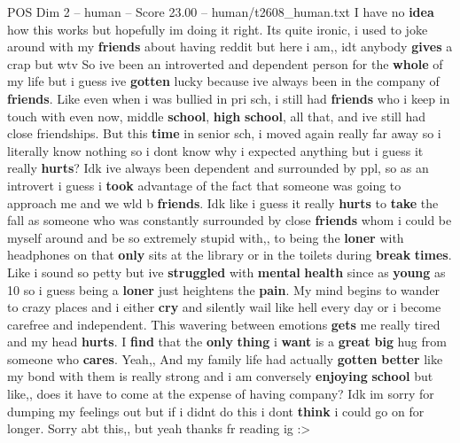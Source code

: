 \begin{textsample}{POS Dim 2 – human – Score 23.00 – human/t2608\_human.txt}  \label{ex:f2_pos_025}
I have no \textbf{idea} how this works but hopefully im doing it right.
Its quite ironic, i used to joke around with my \textbf{friends} about having reddit but here i am,, idt anybody \textbf{gives} a crap but wtv So ive been an introverted and dependent person for the \textbf{whole} of my life but i guess ive \textbf{gotten} lucky because ive always been in the company of \textbf{friends}.
Like even when i was bullied in pri sch, i still had \textbf{friends} who i keep in touch with even now, middle \textbf{school}, \textbf{high} \textbf{school}, all that, and ive still had close friendships.
But this \textbf{time} in senior sch, i moved again really far away so i literally know nothing so i dont know why i expected anything but i guess it really \textbf{hurts}?
Idk ive always been dependent and surrounded by ppl, so as an introvert i guess i \textbf{took} advantage of the fact that someone was going to approach me and we wld b \textbf{friends}.
Idk like i guess it really \textbf{hurts} to \textbf{take} the fall as someone who was constantly surrounded by close \textbf{friends} whom i could be myself around and be so extremely stupid with,, to being the \textbf{loner} with headphones on that \textbf{only} sits at the library or in the toilets during \textbf{break} \textbf{times}.
Like i sound so petty but ive \textbf{struggled} with \textbf{mental} \textbf{health} since as \textbf{young} as 10 so i guess being a \textbf{loner} just heightens the \textbf{pain}.
My mind begins to wander to crazy places and i either \textbf{cry} and silently wail like hell every day or i become carefree and independent.
This wavering between emotions \textbf{gets} me really tired and my head \textbf{hurts}.
I \textbf{find} that the \textbf{only} \textbf{thing} i \textbf{want} is a \textbf{great} \textbf{big} hug from someone who \textbf{cares}.
Yeah,, And my family life had actually \textbf{gotten} \textbf{better} like my bond with them is really strong and i am conversely \textbf{enjoying} \textbf{school} but like,, does it have to come at the expense of having company?
Idk im sorry for dumping my feelings out but if i didnt do this i dont \textbf{think} i could go on for longer.
Sorry abt this,, but yeah thanks fr reading ig :>

\end{textsample}
